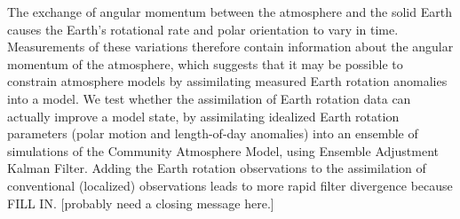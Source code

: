 The exchange of angular momentum between the atmosphere and the solid Earth causes the Earth's rotational rate and polar orientation to vary in time. 
Measurements of these variations therefore contain information about the angular momentum of the atmosphere, which suggests that it may be possible to constrain atmosphere models by assimilating measured Earth rotation anomalies into a model. 
We test whether the assimilation of Earth rotation data can actually improve a model state, by assimilating idealized Earth rotation parameters (polar motion and length-of-day anomalies) into an ensemble of simulations of the Community Atmosphere Model, using Ensemble Adjustment Kalman Filter.
Adding the Earth rotation observations to the assimilation of conventional (localized) observations leads to more rapid filter divergence because \textcolor{alert}{FILL IN}. 
\textcolor{alert}{[probably need a closing message here.]}
